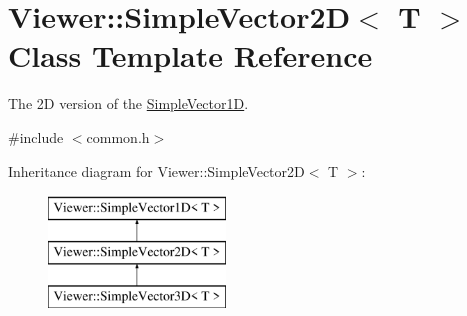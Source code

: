 \hypertarget{classViewer_1_1SimpleVector2D}{}\section{Viewer\+:\+:Simple\+Vector2D$<$ T $>$ Class Template Reference}
\label{classViewer_1_1SimpleVector2D}


The 2D version of the \mbox{\hyperlink{classViewer_1_1SimpleVector1D}{Simple\+Vector1D}}.  




{\ttfamily \#include $<$common.\+h$>$}

Inheritance diagram for Viewer\+:\+:Simple\+Vector2D$<$ T $>$\+:\begin{figure}[H]
\begin{center}
\leavevmode
\includegraphics[height=3.000000cm]{classViewer_1_1SimpleVector2D}
\end{center}
\end{figure}
